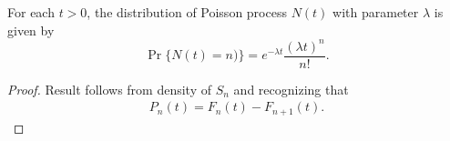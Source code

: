 \documentclass[a4paper,10pt,english]{article}
\begin{document}
\begin{thm} For each $t >0$, the distribution of Poisson process $N(t)$ with parameter $\lambda$ is given by
	\begin{equation*}
	\Pr\{N(t)=n)\}= e^{-\lambda t}\frac{(\lambda t)^{n}}{n!}.
	\end{equation*}
\end{thm}
\begin{proof}
Result follows from density of $S_n$ and recognizing that 
\begin{align*}
P_n(t) = F_n(t) - F_{n+1}(t).
\end{align*}
\end{proof}
\end{document}
